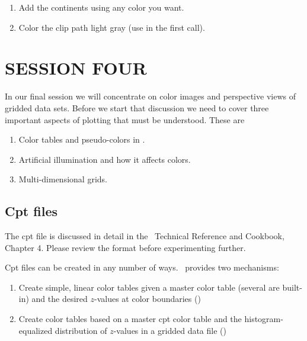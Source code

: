 \documentclass{report}
\begin{document}
\begin{enumerate}

\item Add the continents using any color you want.

\item Color the clip path light gray (use  in the first
 call).

\end{enumerate}

\chapter{SESSION FOUR}
\thispagestyle{headings}

In our final session we will concentrate on color images and
perspective views of gridded data sets.  Before we start that
discussion we need to cover three important aspects of plotting
that must be understood.  These are

\begin{enumerate}
\item Color tables and pseudo-colors in \GMT.
\item Artificial illumination and how it affects colors.
\item Multi-dimensional grids.
\end{enumerate}

\section{Cpt files}

The cpt file is discussed in detail in the \GMT\ Technical Reference
and Cookbook, Chapter 4.  Please review the format before experimenting
further.


Cpt files can be created in any number of ways.  \GMT\ provides
two mechanisms:\

\begin{enumerate}

\item Create simple, linear color tables given a master color table
(several are built-in) and the desired $z$-values at color boundaries
()

\item Create color tables based on a master cpt color table and the
histogram-equalized distribution of $z$-values in a gridded data file ()

\end{enumerate}
\end{document}

